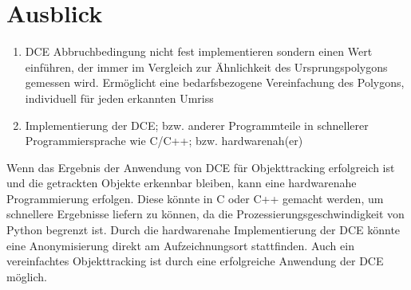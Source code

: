 \section{Ausblick}
\begin{enumerate}
	\item DCE Abbruchbedingung nicht fest implementieren sondern einen Wert einführen, der immer im Vergleich zur Ähnlichkeit des Ursprungspolygons gemessen wird. Ermöglicht eine bedarfsbezogene Vereinfachung des Polygons, individuell für jeden erkannten Umriss
	\item Implementierung der DCE; bzw. anderer Programmteile in schnellerer Programmiersprache wie C/C++; bzw. hardwarenah(er)
\end{enumerate}
{
	Wenn das Ergebnis der Anwendung von DCE für Objekttracking erfolgreich ist und die getrackten Objekte erkennbar bleiben, kann eine hardwarenahe Programmierung erfolgen. Diese könnte in C oder C++ gemacht werden, um schnellere Ergebnisse liefern zu können, da die Prozessierungsgeschwindigkeit von Python begrenzt ist.\newline
Durch die hardwarenahe Implementierung der DCE könnte eine Anonymisierung direkt am Aufzeichnungsort stattfinden. Auch ein vereinfachtes Objekttracking ist durch eine erfolgreiche Anwendung der DCE möglich.


}



